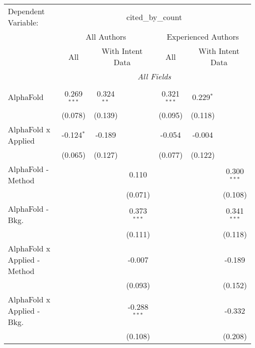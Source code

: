 \begingroup
\centering
\begin{tabular}{lcccccc}
   \tabularnewline \midrule \midrule
   Dependent Variable: & \multicolumn{6}{c}{cited\_by\_count}\\
 & \multicolumn{3}{c}{All Authors} & \multicolumn{3}{c}{Experienced Authors} \\
\cmidrule(lr){2-4} \cmidrule(lr){5-7}
 & \multicolumn{1}{c}{All} & \multicolumn{2}{c}{With Intent Data} & \multicolumn{1}{c}{All} & \multicolumn{2}{c}{With Intent Data} \\
\cmidrule(lr){2-2} \cmidrule(lr){3-4} \cmidrule(lr){5-5} \cmidrule(lr){6-7}
 & \multicolumn{6}{c}{\textit{All Fields}} \\ \\
   AlphaFold                      & 0.269$^{***}$ & 0.324$^{**}$ &                & 0.321$^{***}$ & 0.229$^{*}$ &   \\   
                                  & (0.078)       & (0.139)      &                & (0.095)       & (0.118)     &   \\   
   AlphaFold x Applied            & -0.124$^{*}$  & -0.189       &                & -0.054        & -0.004      &   \\   
                                  & (0.065)       & (0.127)      &                & (0.077)       & (0.122)     &   \\   
   AlphaFold - Method             &               &              & 0.110          &               &             & 0.300$^{***}$\\   
                                  &               &              & (0.071)        &               &             & (0.108)\\   
   AlphaFold - Bkg.               &               &              & 0.373$^{***}$  &               &             & 0.341$^{***}$\\   
                                  &               &              & (0.111)        &               &             & (0.118)\\   
   AlphaFold x Applied - Method   &               &              & -0.007         &               &             & -0.189\\   
                                  &               &              & (0.093)        &               &             & (0.152)\\   
   AlphaFold x Applied - Bkg.     &               &              & -0.288$^{***}$ &               &             & -0.332\\   
                                  &               &              & (0.108)        &               &             & (0.208)\\   

\end{tabular}

